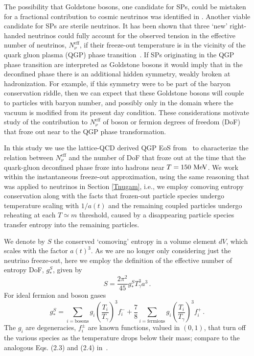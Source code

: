 The possibility that Goldstone bosons, one candidate for SPs,  could be mistaken for a fractional contribution to cosmic neutrinos was  identified in \cite{Weinberg:2013kea}.  Another viable candidate for SPs are sterile neutrinos. It has been shown that  three `new' right-handed neutrinos could fully account for the observed tension in the effective number of neutrinos, $N^{\text{eff}}_{\nu}$, if their freeze-out temperature    is in the vicinity of the quark gluon plasma (QGP) phase transition~\cite{Anchordoqui:2011nh,Anchordoqui:2012qu}.  If SPs originating in the QGP phase transition are interpreted as Goldstone bosons it would imply that in the deconfined phase there is  an additional hidden symmetry, weakly broken at hadronization.  For example, if this symmetry were to be part of the baryon conservation riddle, then we can expect that these Goldstone bosons will  couple to particles with baryon number, and possibly only in the domain where the vacuum is modified from its present day condition.  These considerations motivate  study of the contribution to 
$N^{\text{eff}}_{\nu}$ of boson or fermion degrees of freedom (DoF) that froze out near to the QGP phase transformation. 

In this study we use the  lattice-QCD derived QGP EoS from~\cite{Borsanyi:2013bia} to characterize the relation between $N^{\text{eff}}_{\nu}$ and the number of DoF that froze out at the time that the quark-gluon deconfined phase froze into hadrons near $T=150\text{ MeV}$.  We work within the instantaneous freeze-out approximation, using the same reasoning that was applied to neutrinos in Section \ref{Tnugam}, i.e., we employ comoving entropy conservation along with the facts that   frozen-out particle species undergo temperature scaling with $1/a(t)$  and the remaining coupled particles undergo reheating  at each $T\simeq m$ threshold, caused by a disappearing particle species transfer  entropy   into the remaining  particles.



We denote by $S$ the conserved `comoving' entropy in a volume element $dV$, which scales with the factor $a(t)^3$. As we are no longer only considering just the neutrino freeze-out, here we employ the definition of the effective number of entropy DoF, $g_*^S$, given by
\begin{equation}
S=\frac{2\pi^2}{45}g^S_*T_\gamma^3 a^3\,.
\end{equation} 
For ideal fermion and boson gases
\begin{equation}
g_*^S=\!\!\!\!\sum_{i=\text{bosons}}\!\!\!\!g_i \left(\frac{T_i}{T_\gamma}\right)^3\!\!\!f_i^-+\frac{7}{8}\!\!\!\sum_{i=\text{fermions}}\!\!\!\! g_i \left(\frac{T_i}{T_\gamma}\right)^3\!\!\!f_i^+\,.
\end{equation}
The $g_i$ are degeneracies, $f_i^\pm$ are known functions, valued in $(0,1)$, that turn off the various species as the temperature drops below their mass; compare to the analogous Eqs. (2.3) and (2.4) in~\cite{Blennow:2012de}. 



